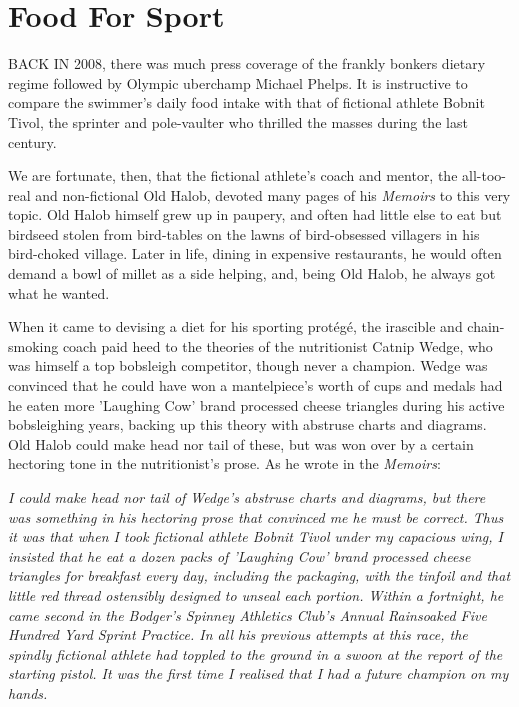 \chapter{Food For Sport}

BACK IN 2008, there was much press coverage of the frankly bonkers dietary regime followed by Olympic uberchamp Michael Phelps. It is instructive to compare the swimmer's daily food intake with that of fictional athlete Bobnit Tivol, the sprinter and pole-vaulter who thrilled the masses during the last century.

We are fortunate, then, that the fictional athlete's coach and mentor, the all-too-real and non-fictional Old Halob, devoted many pages of his \emph{Memoirs} to this very topic. Old Halob himself grew up in paupery, and often had little else to eat but birdseed stolen from bird-tables on the lawns of bird-obsessed villagers in his bird-choked village. Later in life, dining in expensive restaurants, he would often demand a bowl of millet as a side helping, and, being Old Halob, he always got what he wanted.

When it came to devising a diet for his sporting prot\'{e}g\'{e}, the irascible and chain-smoking coach paid heed to the theories of the nutritionist Catnip Wedge, who was himself a top bobsleigh competitor, though never a champion. Wedge was convinced that he could have won a mantelpiece's worth of cups and medals had he eaten more 'Laughing Cow' brand processed cheese triangles during his active bobsleighing years, backing up this theory with abstruse charts and diagrams. Old Halob could make head nor tail of these, but was won over by a certain hectoring tone in the nutritionist's prose. As he wrote in the \emph{Memoirs}:

\emph{I could make head nor tail of Wedge's abstruse charts and diagrams, but there was something in his hectoring prose that convinced me he must be correct. Thus it was that when I took fictional athlete Bobnit Tivol under my capacious wing, I insisted that he eat a dozen packs of 'Laughing Cow' brand processed cheese triangles for breakfast every day, including the packaging, with the tinfoil and that little red thread ostensibly designed to unseal each portion. Within a fortnight, he came second in the Bodger's Spinney Athletics Club's Annual Rainsoaked Five Hundred Yard Sprint Practice. In all his previous attempts at this race, the spindly fictional athlete had toppled to the ground in a swoon at the report of the starting pistol. It was the first time I realised that I had a future champion on my hands.}

